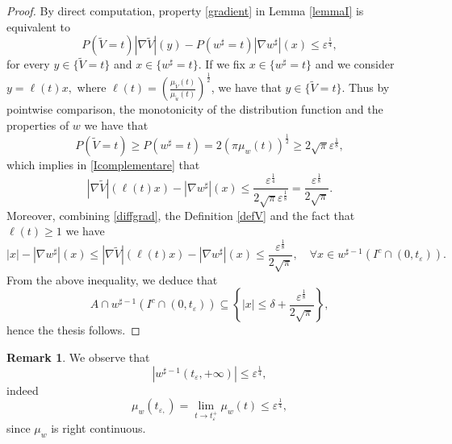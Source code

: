 \documentclass[oneside,a4paper,11pt,notitlepage]{article}
\newcommand{\abs}[1]{{\left|#1\right|}}
\theoremstyle{definition}
\theoremstyle{plain}
\theoremstyle{definition}
\newtheorem{oss}[esempio]{Remark}
\begin{document}
\begin{proof}
    By direct computation, property \eqref{gradient} in Lemma \ref{lemmaI} is equivalent to
    \begin{equation}\label{Icomplementare}
        P(\tilde V = t)\abs{\nabla \tilde V}(y)-P(w^\sharp=t)\abs{\nabla w^\sharp}(x)\leq\varepsilon^\frac14,
    \end{equation}
    for every $y\in\{\tilde V = t\}$ and $x\in\{w^\sharp=t\}$. If we fix $x\in\{w^\sharp=t\}$ and we consider $y=\ell(t)x,$ where $\displaystyle{\ell(t)=\left(\frac{\mu_{\tilde V}(t)}{\mu_{\tilde u}(t)}\right)^\frac{1}{2}}$, we have that $y\in\{\tilde V=t\}$. Thus by pointwise comparison, the monotonicity of the distribution function and the properties of $w$ we have that
    \begin{equation*}
        P(\tilde V = t)\geq P(w^\sharp=t)=2(\pi\mu_w(t))^{\frac 1 2}\geq2\sqrt{\pi}\varepsilon^{\frac18 },
    \end{equation*}
    which implies in \eqref{Icomplementare} that
    \begin{equation}\label{diffgrad}
        \abs{\nabla \tilde V}(\ell(t)x)-\abs{\nabla w^\sharp}(x)\leq\frac{\varepsilon^\frac14}{2\sqrt{\pi}\varepsilon^{\frac18}}=\frac{\varepsilon^{\frac18}}{2\sqrt{\pi}} .
    \end{equation}
    Moreover, combining \eqref{diffgrad}, the Definition \eqref{defV} and the fact that $\ell(t)\geq1$ we have
    \begin{equation*}
        \abs{x}-\abs{\nabla w^\sharp}(x)\leq\abs{\nabla \tilde V}(\ell(t)x)-\abs{\nabla w^\sharp}(x)\leq\frac{\varepsilon^{\frac18}}{2\sqrt{\pi}}, \quad\forall x\in w^{\sharp-1}(I^c \cap (0, t_{\varepsilon})).
    \end{equation*}
    From the above inequality, we deduce that
    \begin{equation*}
        A\cap w^{\sharp-1}(I^c\cap (0, t_{\varepsilon}))\subseteq\left\{\abs{x}\leq\delta+\frac{\varepsilon^{\frac18}}{2\sqrt{\pi}}\right\},
    \end{equation*}
hence the thesis follows.
\end{proof}

\begin{oss}
We observe that 
\begin{equation*}
\abs{w^{\sharp-1}(t_{\varepsilon}, +\infty)}\le\varepsilon^{\frac14},
\end{equation*}
indeed
    $$\mu_w(t_{\varepsilon,})=\lim_{t\rightarrow t_{\varepsilon}^+}\mu_w(t)\leq \varepsilon^{\frac14},$$
    since $\mu_w$ is right continuous.
\end{oss}
\end{document}
